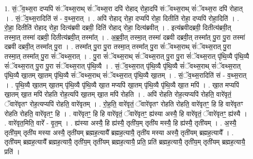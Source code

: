 \documentclass[17pt]{extarticle}
\begin{document}
1. सं॒ॅव॒थ्स॒रा दप्यपि॑ संॅवथ्स॒राथ् सं॑ॅवथ्स॒रा दपि॑ रोहाद् रोहा॒दपि॑ संॅवथ्स॒राथ् सं॑ॅवथ्स॒रा दपि॑ रोहात् । . सं॒ॅव॒थ्स॒रादिति॑ सं - व॒थ्स॒रात् । . अपि॑ रोहाद् रोहा॒ दप्यपि॑ रोहा॒ दितीति॑ रोहा॒ दप्यपि॑ रोहा॒दिति॑ । . रो॒हा॒ दितीति॑ रोहाद् रोहा॒ दित्य॑ब्रवी दब्रवी॒ दिति॑ रोहाद् रोहा॒ दित्य॑ब्रवीत् । . इत्य॑ब्रवीदब्रवी॒ दितीत्य॑ब्रवी॒त् तस्मा॒त् तस्मा॑ दब्रवी॒ दितीत्य॑ब्रवी॒त् तस्मा᳚त् । . अ॒ब्र॒वी॒त् तस्मा॒त् तस्मा॑ दब्रवी दब्रवी॒त् तस्मा᳚त् पु॒रा पु॒रा तस्मा॑ दब्रवी दब्रवी॒त् तस्मा᳚त् पु॒रा । . तस्मा᳚त् पु॒रा पु॒रा तस्मा॒त् तस्मा᳚त् पु॒रा सं॑ॅवथ्स॒राथ् सं॑ॅवथ्स॒रात् पु॒रा तस्मा॒त् तस्मा᳚त् पु॒रा सं॑ॅवथ्स॒रात् । . पु॒रा सं॑ॅवथ्स॒राथ् सं॑ॅवथ्स॒रात् पु॒रा पु॒रा सं॑ॅवथ्स॒रात् पृ॑थि॒व्यै पृ॑थि॒व्यै सं॑ॅवथ्स॒रात् पु॒रा पु॒रा सं॑ॅवथ्स॒रात् पृ॑थि॒व्यै । . सं॒ॅव॒थ्स॒रात् पृ॑थि॒व्यै पृ॑थि॒व्यै सं॑ॅवथ्स॒राथ् सं॑ॅवथ्स॒रात् पृ॑थि॒व्यै खा॒तम् खा॒तम् पृ॑थि॒व्यै सं॑ॅवथ्स॒राथ् सं॑ॅवथ्स॒रात् पृ॑थि॒व्यै खा॒तम् । . सं॒ॅव॒थ्स॒रादिति॑ सं - व॒थ्स॒रात् । . पृ॒थि॒व्यै खा॒तम् खा॒तम् पृ॑थि॒व्यै पृ॑थि॒व्यै खा॒त मप्यपि॑ खा॒तम् पृ॑थि॒व्यै पृ॑थि॒व्यै खा॒त मपि॑ । . खा॒त मप्यपि॑ खा॒तम् खा॒त मपि॑ रोहति रोह॒त्यपि॑ खा॒तम् खा॒त मपि॑ रोहति । . अपि॑ रोहति रोह॒त्यप्यपि॑ रोहति॒ वारे॑वृतं॒ ॅवारे॑वृतꣳ रोह॒त्यप्यपि॑ रोहति॒ वारे॑वृतम् । . रो॒ह॒ति॒ वारे॑वृतं॒ ॅवारे॑वृतꣳ रोहति रोहति॒ वारे॑वृतꣳ॒॒ हि हि वारे॑वृतꣳ रोहति रोहति॒ वारे॑वृतꣳ॒॒ हि । . वारे॑वृतꣳ॒॒ हि हि वारे॑वृतं॒ ॅवारे॑वृतꣳ॒॒ ह्य॑स्या अस्यै॒ हि वारे॑वृतं॒ ॅवारे॑वृतꣳ॒॒ ह्य॑स्यै । . वारे॑वृत॒मिति॒ वारे᳚ - वृ॒त॒म् । . ह्य॑स्या अस्यै॒ हि ह्य॑स्यै॒ तृती॑य॒म् तृती॑य मस्यै॒ हि ह्य॑स्यै॒ तृती॑यम् । . अ॒स्यै॒ तृती॑य॒म् तृती॑य मस्या अस्यै॒ तृती॑यम् ब्रह्मह॒त्यायै᳚ ब्रह्मह॒त्यायै॒ तृती॑य मस्या अस्यै॒ तृती॑यम् ब्रह्मह॒त्यायै᳚ । . तृती॑यम् ब्रह्मह॒त्यायै᳚ ब्रह्मह॒त्यायै॒ तृती॑य॒म् तृती॑यम् ब्रह्मह॒त्यायै॒ प्रति॒ प्रति॑ ब्रह्मह॒त्यायै॒ तृती॑य॒म् तृती॑यम् ब्रह्मह॒त्यायै॒ प्रति॑ । \newline
\end{document}
